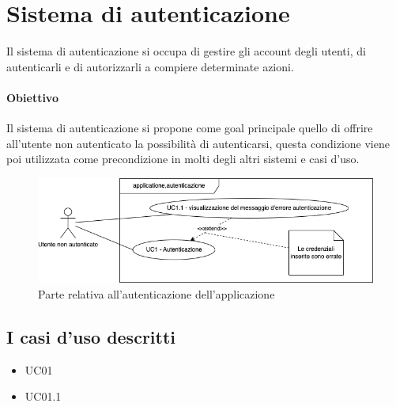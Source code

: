 
\section{Sistema di autenticazione}

Il sistema di autenticazione si occupa di gestire gli account degli utenti, di autenticarli e di autorizzarli a compiere determinate azioni.

\paragraph{Obiettivo} Il sistema di autenticazione si propone come goal principale quello di offrire all'utente non autenticato la possibilità di autenticarsi, questa condizione viene poi utilizzata come precondizione in molti degli altri sistemi e casi d'uso.

\begin{figure}[h]
    \includegraphics[width=\textwidth]{contenuti/img/casi_uso_grafici-applicazione,autenticazione.png}
    \caption{Parte relativa all'autenticazione dell'applicazione}
    \label{fig:autenticazione}
\end{figure}

\subsection{I casi d'uso descritti}

\begin{itemize}
    \item UC01
    \item UC01.1
\end{itemize}